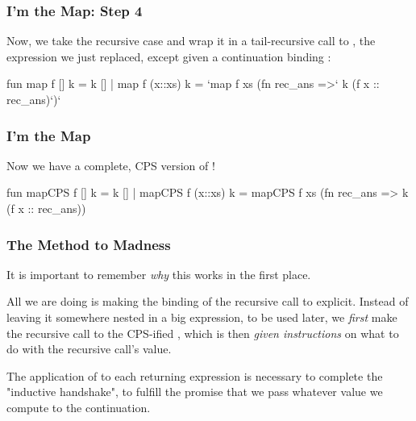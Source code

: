\documentclass[aspectratio=169, handout]{beamer}
\begin{document}
\begin{frame}[fragile]
  \frametitle{I'm the Map: Step 4}

  Now, we take the recursive case and wrap it in a tail-recursive call to
  , the expression we just replaced, except given a continuation binding
  :

  \begin{codeblock}
    fun map f [] k      = k []
      | map f (x::xs) k =
          `map f xs (fn rec_ans =>` k (f x :: rec_ans)`)`
  \end{codeblock}
\end{frame}

\begin{frame}[fragile]
  \frametitle{I'm the Map}

  Now we have a complete, CPS version of !

  \begin{codeblock}
    fun mapCPS f [] k      = k []
      | mapCPS f (x::xs) k =
          mapCPS f xs (fn rec_ans => k (f x :: rec_ans))
  \end{codeblock}
\end{frame}

\begin{frame}[fragile]
  \frametitle{The Method to Madness}

  It is important to remember \textit{why} this works in the first place.

  \pause
  \vspace{\fill}

  All we are doing is making the binding of the recursive call to
   explicit. Instead of leaving it somewhere nested in a big
  expression, to be used later, we \textit{first} make the recursive call to
  the CPS-ified , which is then \textit{given instructions}
  on what to do with the recursive call's value.

  \pause
  \vspace{\fill}

  The application of  to each returning expression is necessary to
  complete the "inductive handshake", to fulfill the promise that we
  pass whatever value we compute to the continuation.
\end{frame}

\begin{comment}
  To demonstrate the difference between CPS and direct-style,
  call for a student volunteer.

  I will ask the student to walk across the room and get a
  "FUNCTIONS ARE POINTERS" sticker. When they return with
  it, I will rip it up.

  I will then ask them to do it again.

  The key distinction is that, I need to remember to rip
  it up when they come back! This is annoying to me, because
  it takes up space in my brain, and generally inconveniences
  me. It would be better if I just told the student to rip it up
  themselves, and then come back with the pieces.
\end{comment}
\end{document}
